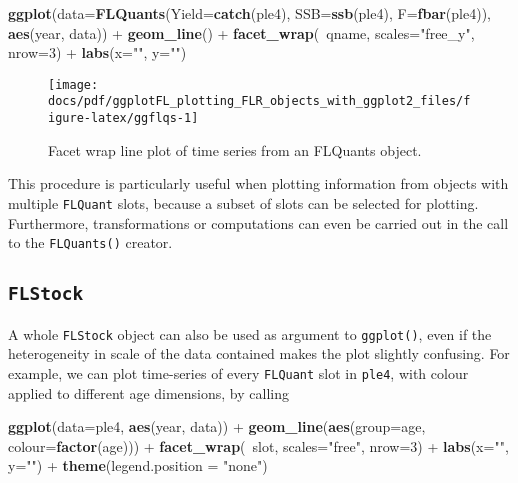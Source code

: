 \documentclass[]{article}
\newenvironment{Shaded}{\begin{snugshade}}{\end{snugshade}}
\newcommand{\KeywordTok}[1]{\textcolor[rgb]{0.13,0.29,0.53}{\textbf{{#1}}}}
\newcommand{\DataTypeTok}[1]{\textcolor[rgb]{0.13,0.29,0.53}{{#1}}}
\newcommand{\DecValTok}[1]{\textcolor[rgb]{0.00,0.00,0.81}{{#1}}}
\newcommand{\StringTok}[1]{\textcolor[rgb]{0.31,0.60,0.02}{{#1}}}
\newcommand{\NormalTok}[1]{{#1}}
\begin{document}
\begin{Shaded}
\begin{Highlighting}[]
\KeywordTok{ggplot}\NormalTok{(}\DataTypeTok{data=}\KeywordTok{FLQuants}\NormalTok{(}\DataTypeTok{Yield=}\KeywordTok{catch}\NormalTok{(ple4), }\DataTypeTok{SSB=}\KeywordTok{ssb}\NormalTok{(ple4), }\DataTypeTok{F=}\KeywordTok{fbar}\NormalTok{(ple4)), }\KeywordTok{aes}\NormalTok{(year, data)) +}\StringTok{ }
\StringTok{  }\KeywordTok{geom_line}\NormalTok{() +}\StringTok{ }\KeywordTok{facet_wrap}\NormalTok{(~qname, }\DataTypeTok{scales=}\StringTok{"free_y"}\NormalTok{, }\DataTypeTok{nrow=}\DecValTok{3}\NormalTok{) +}\StringTok{ }\KeywordTok{labs}\NormalTok{(}\DataTypeTok{x=}\StringTok{""}\NormalTok{, }\DataTypeTok{y=}\StringTok{""}\NormalTok{)}
\end{Highlighting}
\end{Shaded}

\begin{figure}

{\centering \texttt{[image: docs/pdf/ggplotFL\_plotting\_FLR\_objects\_with\_ggplot2\_files/figure-latex/ggflqs-1]} 

}

\caption{Facet wrap line plot of time series from an FLQuants object.}\label{fig:ggflqs}
\end{figure}

This procedure is particularly useful when plotting information from
objects with multiple \texttt{FLQuant} slots, because a subset of slots
can be selected for plotting. Furthermore, transformations or
computations can even be carried out in the call to the
\texttt{FLQuants()} creator.

\subsection{\texorpdfstring{\texttt{FLStock}}{FLStock}}\label{flstock}

A whole \texttt{FLStock} object can also be used as argument to
\texttt{ggplot()}, even if the heterogeneity in scale of the data
contained makes the plot slightly confusing. For example, we can plot
time-series of every \texttt{FLQuant} slot in \texttt{ple4}, with colour
applied to different age dimensions, by calling

\begin{Shaded}
\begin{Highlighting}[]
\KeywordTok{ggplot}\NormalTok{(}\DataTypeTok{data=}\NormalTok{ple4, }\KeywordTok{aes}\NormalTok{(year, data)) +}\StringTok{ }\KeywordTok{geom_line}\NormalTok{(}\KeywordTok{aes}\NormalTok{(}\DataTypeTok{group=}\NormalTok{age, }\DataTypeTok{colour=}\KeywordTok{factor}\NormalTok{(age))) +}\StringTok{ }
\StringTok{  }\KeywordTok{facet_wrap}\NormalTok{(~slot, }\DataTypeTok{scales=}\StringTok{"free"}\NormalTok{, }\DataTypeTok{nrow=}\DecValTok{3}\NormalTok{) +}\StringTok{ }\KeywordTok{labs}\NormalTok{(}\DataTypeTok{x=}\StringTok{""}\NormalTok{, }\DataTypeTok{y=}\StringTok{""}\NormalTok{) +}\StringTok{ }\KeywordTok{theme}\NormalTok{(}\DataTypeTok{legend.position =} \StringTok{"none"}\NormalTok{)}
\end{Highlighting}
\end{Shaded}
\end{document}
